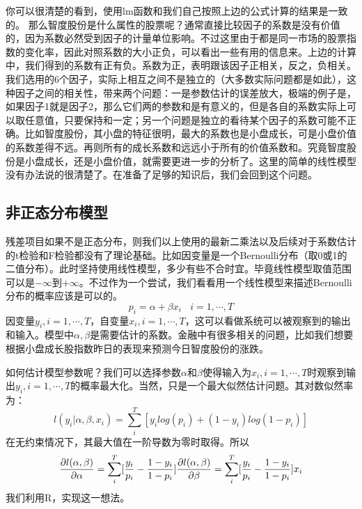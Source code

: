 \documentclass[]{ctexart}
\begin{document}
你可以很清楚的看到，使用lm函数和我们自己按照上边的公式计算的结果是一致的。
那么智度股份是什么属性的股票呢？通常直接比较因子的系数是没有价值的，因为系数必然受到因子的计量单位影响。不过这里由于都是同一市场的股票指数的变化率，因此对照系数的大小正负，可以看出一些有用的信息来。上边的计算中，我们得到的系数有正有负。系数为正，表明跟该因子正相关，反之，负相关。我们选用的6个因子，实际上相互之间不是独立的（大多数实际问题都是如此），这种因子之间的相关性，带来两个问题：一是参数估计的误差放大，极端的例子是，如果因子1就是因子2，那么它们两的参数和是有意义的，但是各自的系数实际上可以取任意值，只要保持和一定；另一个问题是独立的看待某个因子的系数可能不正确。比如智度股份，其小盘的特征很明，最大的系数也是小盘成长，可是小盘价值的系数差得不远。再则所有的成长系数和远远小于所有的价值系数和。究竟智度股份是小盘成长，还是小盘价值，就需要更进一步的分析了。这里的简单的线性模型没有办法说的很清楚了。在准备了足够的知识后，我们会回到这个问题。

\subsection{非正态分布模型}

残差项目如果不是正态分布，则我们以上使用的最新二乘法以及后续对于系数估计的t检验和F检验都没有了理论基础。比如因变量是一个Bernoulli分布（取0或1的二值分布）。此时坚持使用线性模型，多少有些不合时宜。毕竟线性模型取值范围可以是\(-\infty\)到\(+\infty\)。不过作为一个尝试，我们看看用一个线性模型来描述Bernoulli分布的概率应该是可以的。
\[
p_i = \alpha+\beta x_i\ \ \ \  i=1,\cdots,T 
\]
因变量\(y_i,i=1,\cdots,T\)，自变量\(x_i,i=1,\cdots,T\)，这可以看做系统可以被观察到的输出和输入。模型中\(\alpha,\beta\)是需要估计的系数。金融中有很多相关的问题，比如我们想要根据小盘成长股指数昨日的表现来预测今日智度股份的涨跌。

如何估计模型参数呢？我们可以选择参数\(\alpha\)和\(\beta\)使得输入为\(x_i,i=1,\cdots,T\)时观察到输出\(y_i,i=1,\cdots,T\)的概率最大化。当然，只是一个最大似然估计问题。其对数似然率为：
\[
l(y_i|\alpha,\beta,x_i)=\sum_{i}^T [y_ilog(p_i)+(1-y_i)log(1-p_i)  ]
\] 在无约束情况下，其最大值在一阶导数为零时取得。所以 \[
\frac{\partial l(\alpha,\beta)}{\partial \alpha}=\sum_i^T[\frac{y_i}{p_i}-\frac{1-y_i}{1-p_i}] \\
\frac{\partial l(\alpha,\beta)}{\partial \beta}=\sum_i^T[\frac{y_i}{p_i}-\frac{1-y_i}{1-p_i}]x_i
\] 我们利用R，实现这一想法。
\end{document}
